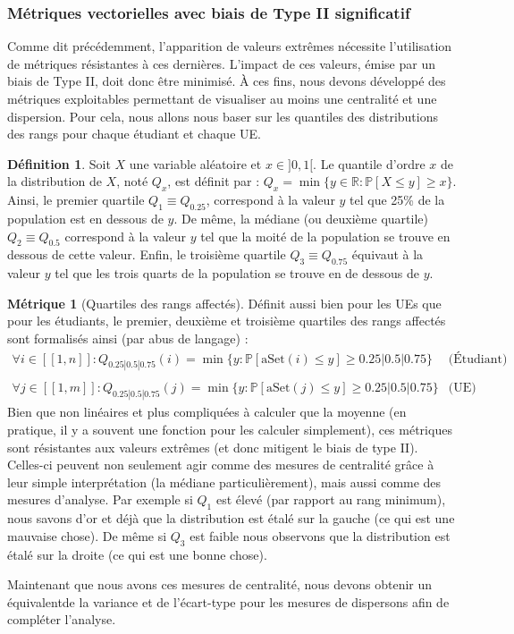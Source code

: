 \documentclass{rapport}
\theoremstyle{definition}
\newtheorem{definition}{Définition}
\theoremstyle{remark}
\theoremstyle{definition}
\newtheorem*{metric}{Métrique}
\theoremstyle{remark}
\newcommand{\llbracket}{[\![}
\newcommand{\rrbracket}{]\!]}
\begin{document}
\subsubsection{Métriques vectorielles avec biais de Type II significatif}
Comme dit précédemment, l'apparition de valeurs extrêmes nécessite l'utilisation de métriques résistantes à ces dernières.
L'impact de ces valeurs, émise par un biais de Type II, doit donc être minimisé. À ces fins, nous devons développé des métriques exploitables permettant de visualiser au moins une centralité et une dispersion.
Pour cela, nous allons nous baser sur les quantiles des distributions des rangs pour chaque étudiant et chaque UE.

\begin{definition}
    Soit $X$ une variable aléatoire et $x\in]0,1[$. Le quantile d'ordre $x$ de la distribution de $X$, noté $Q_x$, est définit par : $Q_x = \min\{y\in\mathbb{R} : \mathbb{P}[X\le y]\ge x\}$.
    Ainsi, le premier quartile $Q_1 \equiv Q_{0.25}$, correspond à la valeur $y$ tel que 25\% de la population est en dessous de $y$.
    De même, la médiane (ou deuxième quartile) $Q_2\equiv Q_{0.5}$ correspond à la valeur $y$ tel que la moité de la population se trouve en dessous de cette valeur.
    Enfin, le troisième quartile $Q_3\equiv Q_{0.75}$ équivaut à la valeur $y$ tel que les trois quarts de la population se trouve en de dessous de $y$.
\end{definition}

\begin{metric}[Quartiles des rangs affectés]
    Définit aussi bien pour les UEs que pour les étudiants, le premier, deuxième et troisième quartiles des rangs affectés sont formalisés ainsi (par abus de langage) :
    $$
    \begin{matrix}
        \forall i\in\llbracket 1, n\rrbracket : Q_{0.25|0.5|0.75}(i) = \min\{y : \mathbb{P}[\text{aSet}(i)\le y]\ge 0.25|0.5|0.75\} & \text{(Étudiant)}\\
        &\\
        \forall j\in\llbracket 1, m\rrbracket : Q_{0.25|0.5|0.75}(j) = \min\{y : \mathbb{P}[\text{aSet}(j)\le y]\ge 0.25|0.5|0.75\} & \text{(UE)}
    \end{matrix}
    $$
    Bien que non linéaires et plus compliquées à calculer que la moyenne (en pratique, il y a souvent une fonction pour les calculer simplement), ces métriques sont résistantes aux valeurs extrêmes (et donc mitigent le biais de type II).
    Celles-ci peuvent non seulement agir comme des mesures de centralité grâce à leur simple interprétation (la médiane particulièrement), mais aussi comme des mesures d'analyse. Par exemple si $Q_1$ est élevé (par rapport au rang minimum), nous savons d'or et déjà que la distribution est étalé sur la gauche (ce qui est une mauvaise chose). De même si $Q_3$ est faible nous observons que la distribution est étalé sur la droite (ce qui est une bonne chose).
\end{metric}
Maintenant que nous avons ces mesures de centralité, nous devons obtenir un \og équivalent\fg de la variance et de l'écart-type pour les mesures de dispersons afin de compléter l'analyse.
\end{document}
